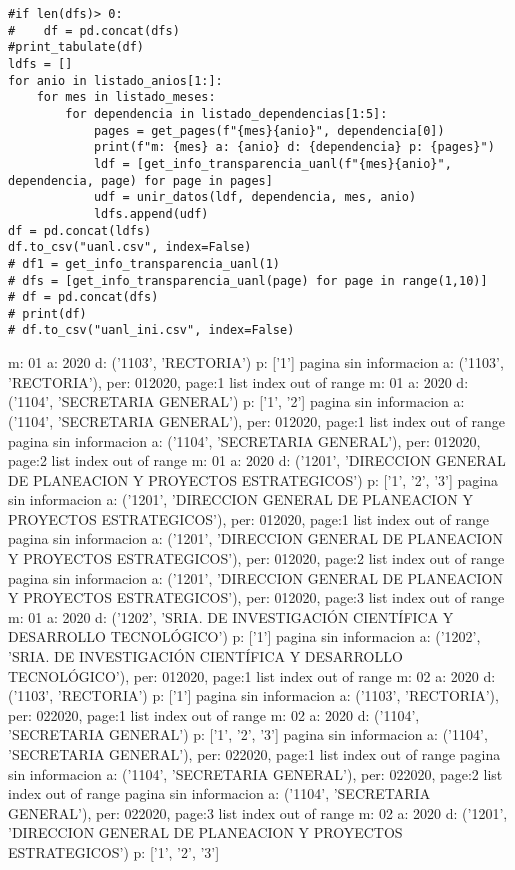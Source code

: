 \documentclass[11pt]{article}
\begin{document}
\begin{verbatim}
#if len(dfs)> 0:
#    df = pd.concat(dfs)
#print_tabulate(df)
ldfs = []
for anio in listado_anios[1:]:
    for mes in listado_meses:
        for dependencia in listado_dependencias[1:5]:
            pages = get_pages(f"{mes}{anio}", dependencia[0])
            print(f"m: {mes} a: {anio} d: {dependencia} p: {pages}")
            ldf = [get_info_transparencia_uanl(f"{mes}{anio}", dependencia, page) for page in pages]
            udf = unir_datos(ldf, dependencia, mes, anio)
            ldfs.append(udf)
df = pd.concat(ldfs)
df.to_csv("uanl.csv", index=False)
# df1 = get_info_transparencia_uanl(1)
# dfs = [get_info_transparencia_uanl(page) for page in range(1,10)]
# df = pd.concat(dfs)
# print(df)
# df.to_csv("uanl_ini.csv", index=False)
\end{verbatim}

m: 01 a: 2020 d: ('1103', 'RECTORIA') p: ['1']
pagina sin informacion a: ('1103', 'RECTORIA'), per: 012020, page:1
list index out of range
m: 01 a: 2020 d: ('1104', 'SECRETARIA GENERAL') p: ['1', '2']
pagina sin informacion a: ('1104', 'SECRETARIA GENERAL'), per: 012020, page:1
list index out of range
pagina sin informacion a: ('1104', 'SECRETARIA GENERAL'), per: 012020, page:2
list index out of range
m: 01 a: 2020 d: ('1201', 'DIRECCION GENERAL DE PLANEACION Y PROYECTOS ESTRATEGICOS') p: ['1', '2', '3']
pagina sin informacion a: ('1201', 'DIRECCION GENERAL DE PLANEACION Y PROYECTOS ESTRATEGICOS'), per: 012020, page:1
list index out of range
pagina sin informacion a: ('1201', 'DIRECCION GENERAL DE PLANEACION Y PROYECTOS ESTRATEGICOS'), per: 012020, page:2
list index out of range
pagina sin informacion a: ('1201', 'DIRECCION GENERAL DE PLANEACION Y PROYECTOS ESTRATEGICOS'), per: 012020, page:3
list index out of range
m: 01 a: 2020 d: ('1202', 'SRIA. DE INVESTIGACIÓN CIENTÍFICA Y DESARROLLO TECNOLÓGICO') p: ['1']
pagina sin informacion a: ('1202', 'SRIA. DE INVESTIGACIÓN CIENTÍFICA Y DESARROLLO TECNOLÓGICO'), per: 012020, page:1
list index out of range
m: 02 a: 2020 d: ('1103', 'RECTORIA') p: ['1']
pagina sin informacion a: ('1103', 'RECTORIA'), per: 022020, page:1
list index out of range
m: 02 a: 2020 d: ('1104', 'SECRETARIA GENERAL') p: ['1', '2', '3']
pagina sin informacion a: ('1104', 'SECRETARIA GENERAL'), per: 022020, page:1
list index out of range
pagina sin informacion a: ('1104', 'SECRETARIA GENERAL'), per: 022020, page:2
list index out of range
pagina sin informacion a: ('1104', 'SECRETARIA GENERAL'), per: 022020, page:3
list index out of range
m: 02 a: 2020 d: ('1201', 'DIRECCION GENERAL DE PLANEACION Y PROYECTOS ESTRATEGICOS') p: ['1', '2', '3']
\end{document}
